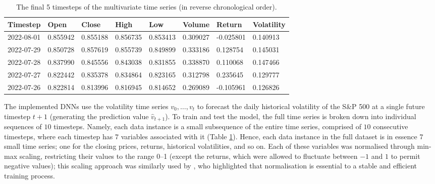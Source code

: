 \documentclass[a4paper, 11pt]{report}
\begin{document}
    \begin{table}[ht]
        \centering
        \begin{tabular}{|l|lllllll|} 
            \hline
            \textbf{Timestep} & \textbf{Open} & \textbf{Close} & \textbf{High} & \textbf{Low} & \textbf{Volume} & \textbf{Return} & \textbf{Volatility}  \\ 
            \hline
            2022-08-01 & 0.855942 & 0.855188 & 0.856735 & 0.853413 & 0.309027 & -0.025801 & 0.140913    \\ 
            \hline
            2022-07-29 & 0.850728 & 0.857619 & 0.855739 & 0.849899 & 0.333186 & 0.128754  & 0.145031    \\ 
            \hline
            2022-07-28 & 0.837990 & 0.845556 & 0.843038 & 0.831855 & 0.338870 & 0.110068  & 0.147466    \\ 
            \hline
            2022-07-27 & 0.822442 & 0.835378 & 0.834864 & 0.823165 & 0.312798 & 0.235645  & 0.129777    \\ 
            \hline
            2022-07-26 & 0.822814 & 0.813996 & 0.816945 & 0.814652 & 0.269089 & -0.105961 & 0.126826    \\
            \hline
        \end{tabular}

        \caption{\centering The final 5 timesteps of the multivariate time series (in reverse chronological order).}
        \label{table: time-series}
    \end{table}


    The implemented DNNs use the volatility time series $v_0, \ldots, v_t$ to forecast the daily historical volatility of the S\&P 500 at a single future timestep $t+1$ (generating the prediction value $\hat{v}_{t+1}$). To train and test the model, the full time series is broken down into individual sequences of $10$ timesteps. Namely, each data instance is a small subsequence of the entire time series, comprised of $10$ consecutive timesteps, where each timestep has $7$ variables associated with it (Table \ref{table: time-series}). Hence, each data instance in the full dataset is in essence $7$ small time series; one for the closing prices, returns, historical volatilities, and so on. Each of these variables was normalised through min-max scaling, restricting their values to the range 0--1 (except the returns, which were allowed to fluctuate between $-1$ and $1$ to permit negative values); this scaling approach was similarly used by \citet{rodikov-2022}, who highlighted that normalisation is essential to a stable and efficient training process.
\end{document}
